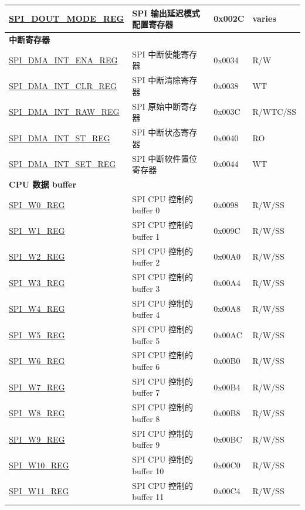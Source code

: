 \begin{longtable}{ | p{5.0cm} | p{7.2cm} | p{1.3cm} | p{2.0cm} | }
\hyperref[regdesc:SPIDOUTMODEREG]{SPI\_DOUT\_MODE\_REG} & SPI 输出延迟模式配置寄存器 & 0x002C & varies \\ \hline
\multicolumn{4}{|l|}{\textbf{中断寄存器}} \\ \hline
\hyperref[regdesc:SPIDMAINTENAREG]{SPI\_DMA\_INT\_ENA\_REG} & SPI 中断使能寄存器  & 0x0034 & R/W \\ \hline
\hyperref[regdesc:SPIDMAINTCLRREG]{SPI\_DMA\_INT\_CLR\_REG} & SPI 中断清除寄存器& 0x0038 & WT \\ \hline
\hyperref[regdesc:SPIDMAINTRAWREG]{SPI\_DMA\_INT\_RAW\_REG} & SPI 原始中断寄存器 & 0x003C & R/WTC/SS \\ \hline
\hyperref[regdesc:SPIDMAINTSTREG]{SPI\_DMA\_INT\_ST\_REG} & SPI 中断状态寄存器 & 0x0040 & RO \\ \hline
\hyperref[regdesc:SPIDMAINTSETREG]{SPI\_DMA\_INT\_SET\_REG} & SPI 中断软件置位寄存器 & 0x0044 & WT \\ \hline
\multicolumn{4}{|l|}{\textbf{CPU 数据 buffer}} \\ \hline
\hyperref[regdesc:SPIW0REG]{SPI\_W0\_REG} & SPI CPU 控制的 buffer 0 & 0x0098 & R/W/SS \\ \hline
\hyperref[regdesc:SPIW1REG]{SPI\_W1\_REG} & SPI CPU 控制的 buffer 1 & 0x009C & R/W/SS \\ \hline
\hyperref[regdesc:SPIW2REG]{SPI\_W2\_REG} & SPI CPU 控制的 buffer 2 & 0x00A0 & R/W/SS \\ \hline
\hyperref[regdesc:SPIW3REG]{SPI\_W3\_REG} & SPI CPU 控制的 buffer 3 & 0x00A4 & R/W/SS \\ \hline
\hyperref[regdesc:SPIW4REG]{SPI\_W4\_REG} & SPI CPU 控制的 buffer 4 & 0x00A8 & R/W/SS \\ \hline
\hyperref[regdesc:SPIW5REG]{SPI\_W5\_REG} & SPI CPU 控制的 buffer 5 & 0x00AC & R/W/SS \\ \hline
\hyperref[regdesc:SPIW6REG]{SPI\_W6\_REG} & SPI CPU 控制的 buffer 6 & 0x00B0 & R/W/SS \\ \hline
\hyperref[regdesc:SPIW7REG]{SPI\_W7\_REG} & SPI CPU 控制的 buffer 7 & 0x00B4 & R/W/SS \\ \hline
\hyperref[regdesc:SPIW8REG]{SPI\_W8\_REG} & SPI CPU 控制的 buffer 8 & 0x00B8 & R/W/SS \\ \hline
\hyperref[regdesc:SPIW9REG]{SPI\_W9\_REG} & SPI CPU 控制的 buffer 9 & 0x00BC & R/W/SS \\ \hline
\hyperref[regdesc:SPIW10REG]{SPI\_W10\_REG} & SPI CPU 控制的 buffer 10 & 0x00C0 & R/W/SS \\ \hline
\hyperref[regdesc:SPIW11REG]{SPI\_W11\_REG} & SPI CPU 控制的 buffer 11 & 0x00C4 & R/W/SS \\ \hline

\end{longtable}

